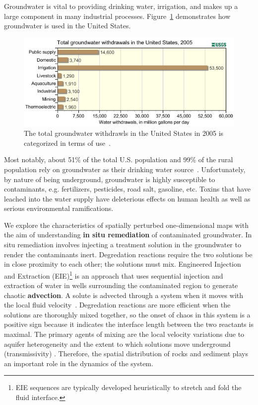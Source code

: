 Groundwater is vital
to providing drinking water, irrigation, and makes up a large
component in many industrial processes. Figure~\ref{fig:gwuse}
demonstrates how groundwater is used in the United States. 
\begin{figure}[!h]
\caption[Groundwater usage in the United States in 2005]{The total
  groundwater withdrawls in the United States in 2005 is categorized
  in terms of use~\cite{usgsgw}.}\label{fig:gwuse}
    \begin{center}
	\includegraphics[scale=0.8]{figs/gwuse.png}
    \end{center}
\end{figure}
Most
notably, about 51\% of the total U.S. population and 99\% of the
rural population rely on groundwater as their drinking water
source~\cite{gw}. Unfortunately, by nature of being underground,
groundwater is highly susceptible to contaminants, e.g. fertilizers,
pesticides, road salt, gasoline, etc. Toxins that have leached into
the water supply have deleterious effects on human health as well as
serious environmental ramifications. 

We explore the characteristics of spatially perturbed one-dimensional
maps with the aim of understanding \textbf{in situ remediation} of contaminated
groundwater. In situ remediation involves injecting a treatment
solution in the groundwater to render the contaminants
inert. Degredation reactions require the two solutions be in close proximity to each other; the solutions must mix. Engineered Injection and Extraction (EIE)\footnote{EIE sequences are typically developed
heuristically to stretch and fold the fluid interface.} is an
approach that uses sequential injection and extraction of water in wells surrounding
the contaminated region to generate chaotic \textbf{advection}. A
solute is advected through a system when it moves with the local fluid
velocity~\cite{advection}. Degredation reactions are more efficient when the solutions are thoroughly mixed
together, so the onset of chaos in this system is a positive sign
because it indicates the interface length between the two reactants is
maximal. The primary agents of mixing are the local velocity
variations due to aquifer heterogeneity and the extent to which
solutions move underground (transmissivity)
\cite{neupauer}. Therefore, the spatial distribution of rocks and
sediment plays an important role in the dynamics of the system. 

